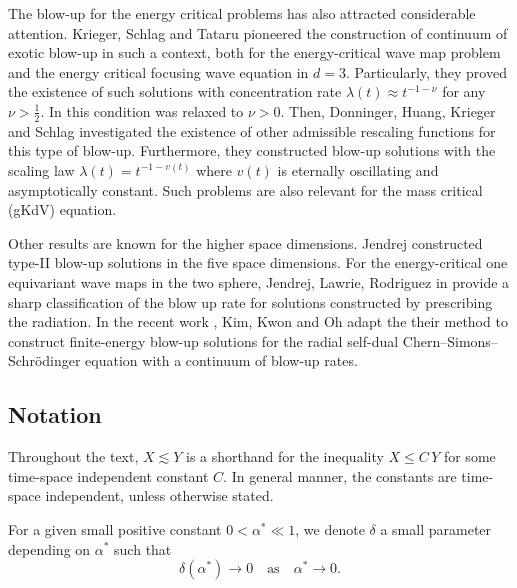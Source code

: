\documentclass[16pt,english, oneside,reqno]{smfart}
\begin{document}
The blow-up for the energy critical problems has also attracted considerable attention. %
Krieger, Schlag and Tataru  \cite{Krieger-Schlag-Tataru-renorm-2008, Krieger-Schlag-Tataru-2009}
pioneered the construction of continuum of exotic blow-up in such a context,
both for the energy-critical wave map problem and the energy critical focusing wave equation in $d=3$. Particularly, they proved the existence of such solutions with concentration rate
$\lambda(t) \approx t^{-1-\nu}$ for any $\nu>\frac 12$. In \cite{Krieger-Schlag-2014} this condition was relaxed to $\nu>0$. Then, Donninger, Huang, Krieger and Schlag \cite{Donninger-Huang-Krieger-Schlag-2014} investigated the existence of other admissible rescaling functions for this type of blow-up. Furthermore, they constructed blow-up solutions with the scaling law $\lambda(t) = t^{-1-v(t)}$ where $v(t)$ is eternally oscillating and asymptotically constant. Such problems are also relevant for the mass critical (gKdV) equation.

Other results are known for the higher space dimensions.
Jendrej \cite{Jendrej-2017} constructed type-II blow-up solutions in the five space dimensions.
For the energy-critical one equivariant wave maps in the two sphere, Jendrej, Lawrie, Rodriguez in \cite{Jendrej-Lawrie-Rodriguez-2022} provide a sharp classification of the blow up rate for solutions constructed by prescribing the radiation. In the recent work \cite{Kim-Kihun-et-al-2024}, Kim, Kwon and Oh adapt the their method to construct finite-energy blow-up solutions for the radial self-dual Chern–Simons–Schrödinger equation with a continuum of blow-up rates.


\subsection{Notation}

Throughout the text, $X\lesssim Y$ is a shorthand for the inequality $X \leq C\,Y $ for some time-space independent constant $C$. In general manner, the constants are time-space independent, unless otherwise stated.

For a given small positive constant $0<\alpha^* \ll 1$, we denote $\delta$ a small parameter depending on $\alpha^*$ such that
\begin{equation}
    \delta(\alpha^*) \to 0 \quad \text{as}\quad \alpha^* \to 0.
\end{equation}
\end{document}
